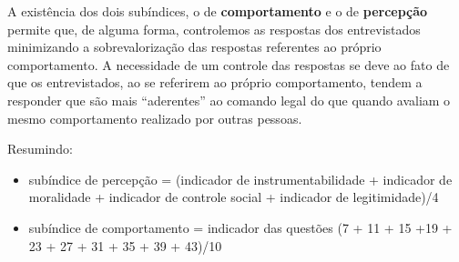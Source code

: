 \documentclass[
	12pt,				%
	openright,			%
	twoside,			%
	a4paper,			%
	chapter=TITLE,		%
	section=TITLE,		%
	subsection=TITLE,	%
	subsubsection=TITLE,%
	spanish,            %
	english,			%
	brazil				%
	]{abntex2}
\begin{document}
\begin{citacao}
A existência dos dois subíndices, o de \textbf{comportamento} e o de \textbf{percepção} permite  que, de alguma forma, controlemos as
respostas dos entrevistados minimizando a sobrevalorização das respostas referentes ao próprio comportamento. A necessidade de um controle das
respostas se deve ao fato de que os entrevistados, ao se referirem ao próprio comportamento, tendem a responder que são mais “aderentes” ao
comando legal do que quando avaliam o mesmo comportamento realizado por outras pessoas.\cite[p. ~3-4]{FGV}
\end{citacao}
Resumindo: 
\begin{itemize}
	\item subíndice de percepção = (indicador de instrumentabilidade + indicador de moralidade + indicador de controle social + indicador de legitimidade)/4
	\item subíndice de comportamento = indicador das questões (7 + 11 + 15 +19 + 23 + 27 + 31 + 35 + 39 + 43)/10
\end{itemize}
\end{document}
